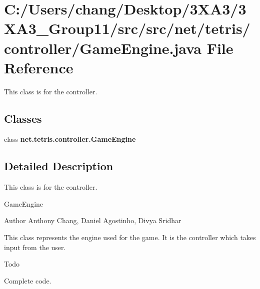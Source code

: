 \section{C\+:/\+Users/chang/\+Desktop/3\+X\+A3/3\+X\+A3\+\_\+\+Group11/src/src/net/tetris/controller/\+Game\+Engine.java File Reference}
\label{_game_engine_8java}


This class is for the controller.  


\subsection*{Classes}
\begin{DoxyCompactItemize}
\item 
class {\bf net.\+tetris.\+controller.\+Game\+Engine}
\end{DoxyCompactItemize}


\subsection{Detailed Description}
This class is for the controller. 

Game\+Engine \begin{DoxyAuthor}{Author}
Anthony Chang, Daniel Agostinho, Divya Sridhar
\end{DoxyAuthor}
This class represents the engine used for the game. It is the controller which takes input from the user. \begin{DoxyRefDesc}{Todo}
\item[{\bf Todo}]Complete code. \end{DoxyRefDesc}
